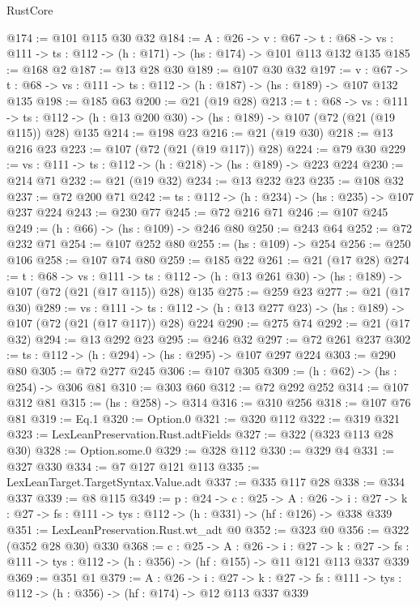 \begin{lexlean}{RustCore}
\begin{coremodule}
@174 := @101 @115 @30 @32
@184 := {A : @26} ->
  {v : @67} ->
  {t : @68} -> {vs : @111} -> {ts : @112} -> (h : @171) -> (hs : @174) -> @101 @113 @132 @135
@185 := @168 @2
@187 := @13 @28 @30
@189 := @107 @30 @32
@197 := {v : @67} ->
  {t : @68} -> {vs : @111} -> {ts : @112} -> (h : @187) -> (hs : @189) -> @107 @132 @135
@198 := @185 @63
@200 := @21 (@19 @28)
@213 := {t : @68} ->
  {vs : @111} ->
  {ts : @112} -> (h : @13 @200 @30) -> (hs : @189) -> @107 (@72 (@21 (@19 @115)) @28) @135
@214 := @198 @23
@216 := @21 (@19 @30)
@218 := @13 @216 @23
@223 := @107 (@72 (@21 (@19 @117)) @28)
@224 := @79 @30
@229 := {vs : @111} -> {ts : @112} -> (h : @218) -> (hs : @189) -> @223 @224
@230 := @214 @71
@232 := @21 (@19 @32)
@234 := @13 @232 @23
@235 := @108 @32
@237 := @72 @200 @71
@242 := {ts : @112} -> (h : @234) -> (hs : @235) -> @107 @237 @224
@243 := @230 @77
@245 := @72 @216 @71
@246 := @107 @245
@249 := (h : @66) -> (hs : @109) -> @246 @80
@250 := @243 @64
@252 := @72 @232 @71
@254 := @107 @252 @80
@255 := (hs : @109) -> @254
@256 := @250 @106
@258 := @107 @74 @80
@259 := @185 @22
@261 := @21 (@17 @28)
@274 := {t : @68} ->
  {vs : @111} ->
  {ts : @112} -> (h : @13 @261 @30) -> (hs : @189) -> @107 (@72 (@21 (@17 @115)) @28) @135
@275 := @259 @23
@277 := @21 (@17 @30)
@289 := {vs : @111} ->
  {ts : @112} -> (h : @13 @277 @23) -> (hs : @189) -> @107 (@72 (@21 (@17 @117)) @28) @224
@290 := @275 @74
@292 := @21 (@17 @32)
@294 := @13 @292 @23
@295 := @246 @32
@297 := @72 @261 @237
@302 := {ts : @112} -> (h : @294) -> (hs : @295) -> @107 @297 @224
@303 := @290 @80
@305 := @72 @277 @245
@306 := @107 @305
@309 := (h : @62) -> (hs : @254) -> @306 @81
@310 := @303 @60
@312 := @72 @292 @252
@314 := @107 @312 @81
@315 := (hs : @258) -> @314
@316 := @310 @256
@318 := @107 @76 @81
@319 := Eq.{1}
@320 := Option.{0}
@321 := @320 @112
@322 := @319 @321
@323 := LexLeanPreservation.Rust.adtFields
@327 := @322 (@323 @113 @28 @30)
@328 := Option.some.{0}
@329 := @328 @112
@330 := @329 @4
@331 := @327 @330
@334 := @7 @127 @121 @113
@335 := LexLeanTarget.TargetSyntax.Value.adt
@337 := @335 @117 @28
@338 := @334 @337
@339 := @8 @115
@349 := {p : @24} ->
  {c : @25} ->
  {A : @26} ->
  {i : @27} -> {k : @27} -> {fs : @111} -> {tys : @112} -> (h : @331) -> (hf : @126) -> @338 @339
@351 := LexLeanPreservation.Rust.wt_adt @0
@352 := @323 @0
@356 := @322 (@352 @28 @30) @330
@368 := {c : @25} ->
  {A : @26} ->
  {i : @27} ->
  {k : @27} -> {fs : @111} -> {tys : @112} -> (h : @356) -> (hf : @155) -> @11 @121 @113 @337 @339
@369 := @351 @1
@379 := {A : @26} ->
  {i : @27} ->
  {k : @27} -> {fs : @111} -> {tys : @112} -> (h : @356) -> (hf : @174) -> @12 @113 @337 @339

\end{coremodule}
\end{lexlean}
